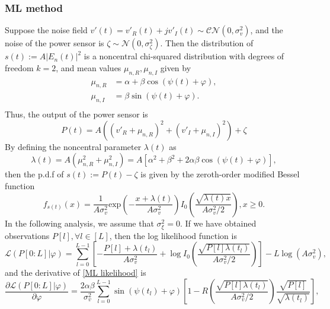 \documentclass[12pt,draftclsnofoot,journal,onecolumn]{IEEEtran}
\theoremstyle{nonumberplain}
\def \exp {\text{exp}}
\begin{document}
\subsubsection{ML method}
    Suppose the noise field $v'(t)=v'_R(t) + jv'_I(t)\sim \mathcal{CN}(0, \sigma_v^2)$, and the noise of the power sensor is $\zeta \sim \mathcal{N}(0, \sigma_{\zeta}^2)$. Then the distribution of $s(t) := A\left|E_n(t)\right|^2$ is a noncentral chi-squared distribution with degrees of freedom $k=2$, and mean values $\mu_{n,R}, \mu_{n,I}$ given by
    \begin{equation}
        \begin{aligned}
        \mu_{n,R} & = \alpha + \beta \cos(\psi(t)+\varphi),    \\ 
        \mu_{n,I} & = \beta \sin(\psi(t)+\varphi).   \\
        \end{aligned}
    \end{equation}
    Thus, the output of the power sensor is 
    \begin{equation}
        P(t)  = A\left((v'_{R} + \mu_{n,R})^2 + (v'_{I} + \mu_{n,I})^2 \right)+ \zeta 
    \end{equation}
    By defining the noncentral parameter $\lambda(t)$ as
    \begin{equation}
        \lambda(t)  = A(\mu_{n,R}^2 + \mu_{n,I}^2) = A\left[\alpha^{2}+\beta^{2}+2\alpha\beta\cos\left(\psi(t)+\varphi\right)\right],
    \end{equation}
    then the p.d.f of $s(t) := P(t)-\zeta$ is given by the zeroth-order modified Bessel function
    \begin{equation}
        f_{s(t)}(x) = \frac{1}{A\sigma_{v}^2} \exp\left(-\frac{x+\lambda(t)}{A\sigma_v^2}\right)I_{0}\left(\frac{\sqrt{\lambda(t) x}}{A\sigma_v^2/2}\right), x \geq 0.
        \label{ML single observation}
    \end{equation}
    In the following analysis, we assume that $\sigma_{\xi}^2 = 0$. If we have obtained observations $P[l], \forall l\in [L]$, then the log likelihood function is 
    \begin{equation}
        \mathcal{L}(P[0:L] | \varphi) = \sum_{l=0}^{L-1}\left[-\frac{P[l] + \lambda(t_l)}{A\sigma_v^2} + \log I_0\left(\frac{\sqrt{P[l] \lambda(t_l)}}{A\sigma_v^2/2}\right)\right] - L\log(A\sigma_v^2),
        \label{ML likelihood}
    \end{equation}
    and the derivative of \eqref{ML likelihood} is 
    \begin{equation}
        \frac{\partial \mathcal{L}(P[0:L] | \varphi)}{\partial \varphi} = \frac{2\alpha\beta}{\sigma_v^2}\sum_{l=0}^{L-1}\sin(\psi(t_l)+\varphi) \left[1 - R\left( \frac{\sqrt{P[l]\lambda(t_l)}}{A\sigma_v^2/2} \right) \frac{\sqrt{P[l]}}{\sqrt{\lambda(t_l)}}\right],
    \end{equation}
\end{document}
